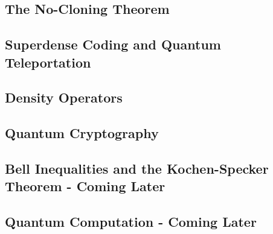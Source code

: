 \subsection{The No-Cloning Theorem}

\subsection{Superdense Coding and Quantum Teleportation}

\subsection{Density Operators}

\subsection{Quantum Cryptography}

\subsection{Bell Inequalities and the Kochen-Specker Theorem - Coming Later}

\subsection{Quantum Computation - Coming Later}
